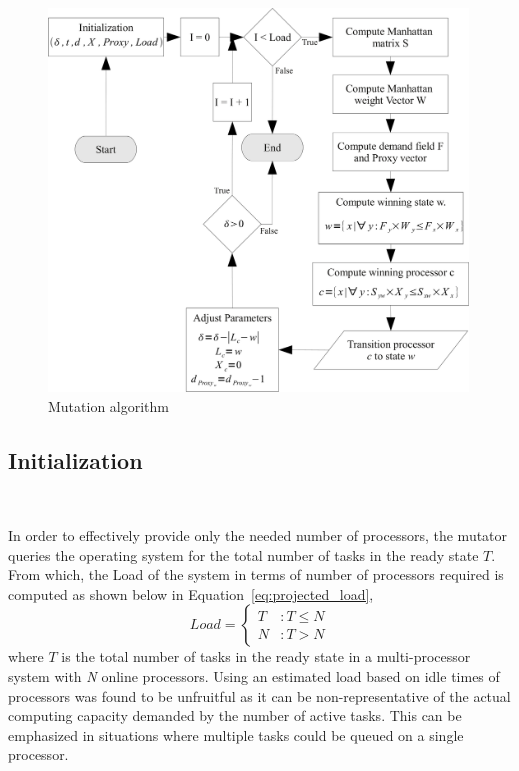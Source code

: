 \begin{figure}[h!]
  \begin{center}
    \includegraphics[height=4in]{figures/Mutation_algo.jpg}
    \caption{Mutation algorithm}
    \label{fig:mutation_algo}
  \end{center}
\end{figure}

\subsection{Initialization}~\label{sec:mut_init}

In order to effectively provide only the needed number of processors, the mutator
queries the operating system for the total number of tasks in the ready state $T$. 
From which, the Load of the system in terms of number of processors required is computed 
as shown below in Equation~\eqref{eq:projected_load},
\begin{equation}
    Load = \left\{
     \begin{array}{lr}
       T & : T \leq N\\
       N & : T > N
     \end{array}
   \right.
\label{eq:projected_load}
\end{equation}
where $T$ is the total number of tasks in the ready state in a multi-processor system with \textit{N} online processors.
Using an estimated load based on idle times
of processors was found to be unfruitful as it can be non-representative of the actual 
computing capacity demanded by the number of active tasks. This can be emphasized in situations where multiple
tasks could be queued on a single processor.

